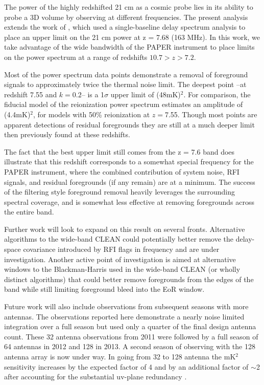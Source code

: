 \documentclass[preprint2]{aastex}
\begin{document}
The power of the highly redshifted 21 cm as a cosmic probe lies in its ability to probe a 3D volume by observing at different frequencies.  The present analysis extends the work of  \cite{Parsons:2014p10499}, which used a single-baseline delay spectrum analysis to place an upper limit on the 21 cm power at z = 7.68 (163 MHz).  In this work, we take advantage of the wide bandwidth of the PAPER instrument to place limits on the power spectrum at a range of redshifts $10.7>z>7.2$.  

Most of the power spectrum data points demonstrate a removal of foreground signals to approximately twice the thermal noise limit. The deepest point --at redshift 7.55 and $k=0.2$-- is a 1$\sigma$ upper limit of (48mK)$^2$. For comparison, the \citet{Lidz:2008p8251} fiducial model of the reionization power spectrum estimates an amplitude of (4.4mK)$^2$, for models with 50\% reionization at $z=$7.55.  Though most points are apparent detections of residual foregrounds they are still at a much deeper limit then previously found at these redshifts.

The fact that the best upper limit still comes from the z = 7.6 band does illustrate that this redshift corresponds to a somewhat special frequency for the PAPER instrument, where the combined contribution of system noise, RFI signals, and residual foregrounds (if any remain) are at a minimum.  The success of the filtering style foreground removal heavily leverages the surrounding spectral coverage, and is somewhat less effective at removing foregrounds across the entire band. 

Further work will look to expand on this result on several fronts.  Alternative algorithms to the wide-band CLEAN could potentially better remove the delay-space covariance introduced by RFI flags in frequency and are under investigation.  Another active point of investigation is aimed at alternative windows to the Blackman-Harris used in the wide-band CLEAN (or wholly distinct algorithms) that could better remove foregrounds from the edges of the band while still limiting foreground bleed into the EoR window.  

Future work will also include observations from subsequent seasons with more antennas.  The observations reported here demonstrate a nearly noise limited integration over a full season but used only a quarter of the final design antenna count. These  32 antenna observations from 2011 were followed by a full season of 64 antennas in 2012 and 128 in 2013.  A second season of observing with the 128 antenna array is now under way. In going from  32 to 128 antenna the mK$^2$ sensitivity increases by the expected factor of 4 and by an additional factor of $\sim$2 after accounting for the substantial uv-plane redundancy \citep{Parsons:2012p9028}. 
\end{document}
